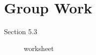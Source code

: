 \documentclass[11pt]{article}
\begin{document}

\section*{Group Work}
\begin{description}
\item[Section 5.3] worksheet
\end{description}
\end{document}
